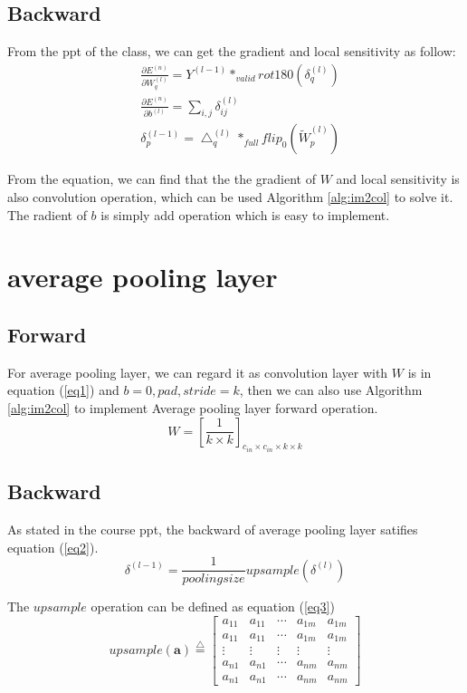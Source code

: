 \documentclass{elegantbook}
\begin{document}
\subsection{Backward}
From the ppt of the class, we can get the gradient and local sensitivity as follow:
\begin{equation}
\begin{aligned}
&\frac{\partial E^{(n)}}{\partial W_q^{(l)}}=Y^{(l-1)}*_{valid} rot180(\delta_q^{(l)}) \\
&\frac{\partial E^{(n)}}{\partial b^{(l)}}=\sum_{i,j}\delta_{ij}^{(l)} \\
&\delta_p^{(l-1)}=\bigtriangleup_q^{(l)}*_{full} flip_0(\tilde{W}_p^{(l)})
\end{aligned}
\end{equation}

From the equation, we can find that the the gradient of $W$ and local sensitivity is also convolution operation, which can be used Algorithm \ref{alg:im2col} to solve it. The radient of $b$ is simply add operation which is easy to implement.
\section{average pooling layer}

\subsection{Forward}
For average pooling layer, we can regard it as convolution layer with $W$ is in equation (\ref{eq1}) and $b=0, pad, stride=k$, then we can also use Algorithm \ref{alg:im2col} to implement Average pooling layer forward operation.
\begin{equation}
\label{eq1}
W=\left[\frac{1}{k\times k}\right]_{c_{in}\times c_{in}\times k\times k}
\end{equation}

\subsection{Backward}
As stated in the course ppt, the backward of average pooling layer satifies equation (\ref{eq2}).
\begin{equation}
\label{eq2}
\delta^{(l-1)}=\frac{1}{poolingsize}upsample(\delta^{(l)})
\end{equation}

The $upsample$ operation can be defined as equation (\ref{eq3})
\begin{equation}
\label{eq3}
upsample(\mathbf{a})\overset{\bigtriangleup}{=}
\left[
\begin{array}{cc|c|cc}
a_{11} & a_{11} & \cdots & a_{1m} & a_{1m} \\
a_{11} & a_{11} & \cdots & a_{1m} & a_{1m} \\
\hline
\vdots & \vdots & \vdots & \vdots & \vdots \\
\hline
a_{n1} & a_{n1} & \cdots & a_{nm} & a_{nm} \\
a_{n1} & a_{n1} & \cdots & a_{nm} & a_{nm}
\end{array}
\right]
\end{equation}
\end{document}
